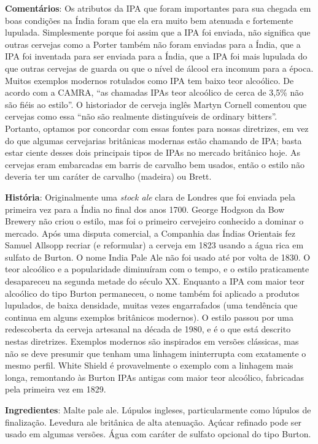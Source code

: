 \textbf{Comentários}: Os atributos da IPA que foram importantes para sua chegada em boas condições na Índia foram que ela era muito bem atenuada e fortemente lupulada. Simplesmente porque foi assim que a IPA foi enviada, não significa que outras cervejas como a Porter também não foram enviadas para a Índia, que a IPA foi inventada para ser enviada para a Índia, que a IPA foi mais lupulada do que outras cervejas de guarda ou que o nível de álcool era incomum para a época. Muitos exemplos modernos rotulados como IPA tem baixo teor alcoólico. De acordo com a CAMRA, “as chamadas IPAs teor alcoólico de cerca de 3,5\% não são fiéis ao estilo”. O historiador de cerveja inglês Martyn Cornell comentou que cervejas como essa “não são realmente distinguíveis de ordinary bitters”. Portanto, optamos por concordar com essas fontes para nossas diretrizes, em vez do que algumas cervejarias britânicas modernas estão chamando de IPA; basta estar ciente desses dois principais tipos de IPAs no mercado britânico hoje. As cervejas eram embarcadas em barris de carvalho bem usados, então o estilo não deveria ter um caráter de carvalho (madeira) ou Brett.

\textbf{História}: Originalmente uma \textit{stock ale} clara de Londres que foi enviada pela primeira vez para a Índia no final dos anos 1700. George Hodgson da Bow Brewery não criou o estilo, mas foi o primeiro cervejeiro conhecido a dominar o mercado. Após uma disputa comercial, a Companhia das Índias Orientais fez Samuel Allsopp recriar (e reformular) a cerveja em 1823 usando a água rica em sulfato de Burton. O nome India Pale Ale não foi usado até por volta de 1830. O teor alcoólico e a popularidade diminuíram com o tempo, e o estilo praticamente desapareceu na segunda metade do século XX. Enquanto a IPA com maior teor alcoólico do tipo Burton permaneceu, o nome também foi aplicado a produtos lupulados, de baixa densidade, muitas vezes engarrafados (uma tendência que continua em alguns exemplos britânicos modernos). O estilo passou por uma redescoberta da cerveja artesanal na década de 1980, e é o que está descrito nestas diretrizes. Exemplos modernos são inspirados em versões clássicas, mas não se deve presumir que tenham uma linhagem ininterrupta com exatamente o mesmo perfil. White Shield é provavelmente o exemplo com a linhagem mais longa, remontando às Burton IPAs antigas com maior teor alcoólico, fabricadas pela primeira vez em 1829.

\textbf{Ingredientes}: Malte pale ale. Lúpulos ingleses, particularmente como lúpulos de finalização. Levedura ale britânica de alta atenuação. Açúcar refinado pode ser usado em algumas versões. Água com caráter de sulfato opcional do tipo Burton.

